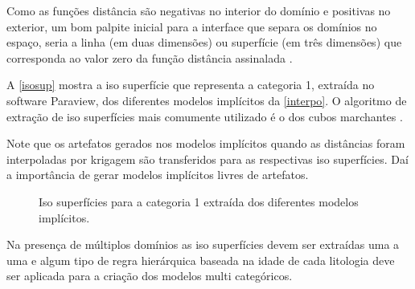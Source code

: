 Como as funções distância são negativas no interior do domínio e positivas no exterior, um bom palpite inicial para a interface que separa os domínios no espaço, seria a linha (em duas dimensões) ou superfície (em três dimensões) que corresponda ao valor zero da função distância assinalada \cite{wildedeutschcalibrate}. 

A \autoref{isosup} mostra a iso superfície que representa a categoria 1, extraída no software Paraview, dos diferentes modelos implícitos da \autoref{interpo}. O algoritmo de extração de iso superfícies mais comumente utilizado é o dos cubos marchantes \cite{lorensen1987marching}. 

Note que os artefatos gerados nos modelos implícitos quando as distâncias foram interpoladas por krigagem são transferidos para as respectivas iso superfícies. Daí a importância de gerar modelos implícitos livres de artefatos.


\begin{figure}[H]
    \caption{Iso superfícies para a categoria 1 extraída dos diferentes modelos implícitos.} \label{isosup}
     \centering
\end{figure}

Na presença de múltiplos domínios as iso superfícies devem ser extraídas uma a uma e algum tipo de regra hierárquica baseada na idade de cada litologia deve ser aplicada para a criação dos modelos multi categóricos.

